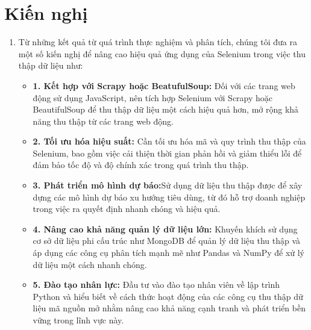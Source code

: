 \section{Kiến nghị}
\begin{enumerate}
    \item []\hspace*{0.7cm}Từ những kết quả từ quá trình thực nghiệm và phân tích, chúng tôi đưa ra một số kiến nghị để nâng cao hiệu quả ứng dụng của Selenium trong việc thu thập dữ liệu như:

    \begin{itemize}[left=0.3cm]
        \item[] \textbf{1. Kết hợp với Scrapy hoặc BeatufulSoup:} Đối với các trang web động sử dụng JavaScript, nên tích hợp Selenium với Scrapy hoặc BeautifulSoup để thu thập dữ liệu một cách hiệu quả hơn, mở rộng khả năng thu thập từ các trang web động.
        
        \item[]\textbf{2. Tối ưu hóa hiệu suất:} Cần tối ưu hóa mã và quy trình thu thập của Selenium, bao gồm việc cải thiện thời gian phản hồi và giảm thiểu lỗi để đảm bảo tốc độ và độ chính xác trong quá trình thu thập.

        \item[] \textbf{3. Phát triển mô hình dự báo:}Sử dụng dữ liệu thu thập được để xây dựng các mô hình dự báo xu hướng tiêu dùng, từ đó hỗ trợ doanh nghiệp trong việc ra quyết định nhanh chóng và hiệu quả.

        \item[] \textbf{4. Nâng cao khả năng quản lý dữ liệu lớn:} Khuyến khích sử dụng cơ sở dữ liệu phi cấu trúc như MongoDB để quản lý dữ liệu thu thập và áp dụng các công cụ phân tích mạnh mẽ như Pandas và NumPy để xử lý dữ liệu một cách nhanh chóng.

        \item[] \textbf{5. Đào tạo nhân lực:} Đầu tư vào đào tạo nhân viên về lập trình Python và hiểu biết về cách thức hoạt động của các công cụ thu thập dữ liệu mã nguồn mở nhằm nâng cao khả năng cạnh tranh và phát triển bền vững trong lĩnh vực này.
    \end{itemize}
\end{enumerate}